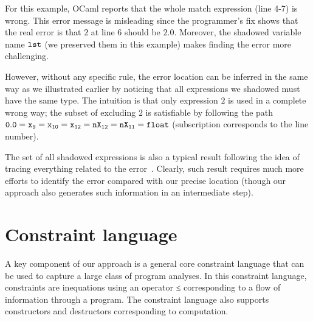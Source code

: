 For this example, OCaml reports that the whole match expression (line
4-7) is wrong. This error message is misleading since the programmer's
fix shows that the real error is that $2$ at line 6 should be $2.0$.
Moreover, the shadowed variable name $\mathtt{lst}$ (we preserved them in
this example) makes finding the error more challenging.

However, without any specific rule, the error location can be inferred
in the same way as we illustrated earlier by noticing that all
expressions we shadowed must have the same type. The intuition is that
only expression $2$ is used in a complete wrong way; the subset of
excluding $2$ is satisfiable by following the path
$\mathtt{0.0=x_{9}=x_{10}=x_{12}=nX_{12}=nX_{11}=float}$ (subscription
corresponds to the line number).

The set of all shadowed expressions is also a typical result following
the idea of tracing everything related to the
error~\cite{wand-errorfinding,choppella95, haack:slicing,
tip:slicing}. Clearly, such result requires much more efforts to
identify the error compared with our precise location (though our
approach also generates such information in an intermediate step).

% 
% 
% 
% 
\section{Constraint language}
\label{sec:language}

A key component of our approach is a general core constraint language
that can be used to capture a large class of program analyses.
In this constraint language, constraints are inequations using an
operator ≤ corresponding
to a flow of information through a program. The constraint language
also supports constructors and destructors corresponding to
computation.

